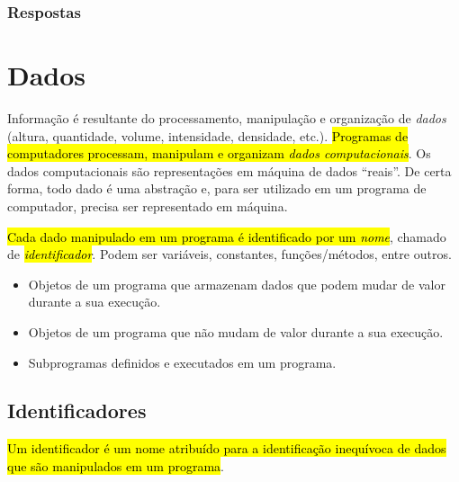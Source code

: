 \ifisbook
\subsubsection{Respostas}
\shipoutAnswer
\fi

\section{Dados}\label{cap_lingua_sec_dados}

Informação é resultante do processamento, manipulação e organização de \emph{dados} (altura, quantidade, volume, intensidade, densidade, etc.). \hl{Programas de computadores processam, manipulam e organizam \emph{dados computacionais}}. Os dados computacionais são representações em máquina de dados ``reais''. De certa forma, todo dado é uma abstração e, para ser utilizado em um programa de computador, precisa ser representado em máquina.

\hl{Cada dado manipulado em um programa é identificado por um \emph{nome}}, chamado de \hl{\emph{identificador}}. Podem ser variáveis, constantes, funções/métodos, entre outros.
\begin{itemize}
\item {}

  Objetos de um programa que armazenam dados que podem mudar de valor durante a sua execução.

\item {}

  Objetos de um programa que não mudam de valor durante a sua execução.

\item {}

  Subprogramas definidos e executados em um programa.
\end{itemize}

\subsection{Identificadores}

\hl{Um identificador é um nome atribuído para a identificação inequívoca de dados que são manipulados em um programa}.

